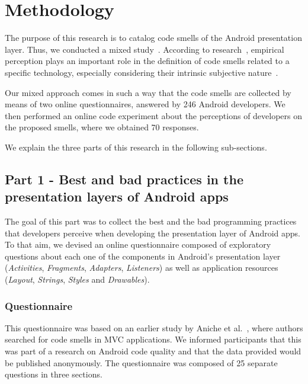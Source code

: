 \section{Methodology}

The purpose of this research is to catalog code smells of the Android presentation layer. Thus, we conducted a mixed study~\cite{CreswellResearch:13}. According to research~\cite{arcverde2011understanding, Palomba_Do_2014, yamashita2013developers}, empirical perception plays an important role in the definition of code smells related to a specific technology, especially considering their intrinsic subjective nature~\cite{JavascriptSmells, JavaQADetectingSmells:02}.

Our mixed approach comes in such a way that the code smells are collected by means of two online questionnaires, answered by 246 Android developers. We then performed an online code experiment about the perceptions of developers on the proposed smells, where we obtained 70 responses. 

We explain the three parts of this research in the following sub-sections.

\subsection{Part 1 - Best and bad practices in the presentation layers of Android apps}
\label{etapa-1}

The goal of this part was to collect the best and the bad programming practices 
that developers perceive when developing the presentation layer of Android apps.
To that aim, we devised an online questionnaire composed of exploratory questions
about each one of the components in Android's presentation layer 
(\textit{Activities}, \textit{Fragments}, \textit{Adapters}, \textit{Listeners}) 
as well as application resources (\textit{Layout}, \textit{Strings}, 
\textit{Styles} and \textit{Drawables}). 

\subsubsection{Questionnaire}
\label{etapa-1-questionario}

This questionnaire was based on an earlier study by Aniche et al.~\cite{AnicheSmellsMVC:17, FinavaroAniche2016}, where authors searched for code smells in \acs{MVC} applications. 
We informed participants that this was part of a research on Android code quality and that the data provided would be published anonymously. The questionnaire was composed of 25 separate questions in three sections.

